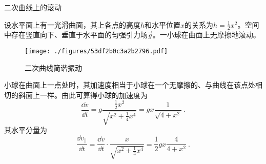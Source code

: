 \begin{example}{二次曲线上的滚动}

设水平面上有一光滑曲面，其上各点的高度$h$和水平位置$x$的关系为$h=\frac{1}{2}x^2$。空间中存在竖直向下、垂直于水平面的匀强引力场$\vec{g}$。一小球在曲面上无摩擦地滚动。

\begin{figure}[ht]
\centering
\texttt{[image: ./figures/53df2b0c3a2b2796.pdf]}
\caption{二次曲线简谐振动} \label{fig_SHOhs_2}
\end{figure}

小球在曲面上一点处时，其加速度相当于小球在一个无摩擦的、与曲线在该点处相切的斜面上一样。由此可算得小球的加速度为
\begin{equation}
\frac{\dd v}{\dd t} = g\frac{\frac{1}{2}x^2}{\sqrt{x^2+\frac{1}{4}x^4}} = gx\frac{1}{\sqrt{4+x^2}}~. 
\end{equation}
其水平分量为
\begin{equation}
\frac{\dd v_\parallel}{\dd t} = \frac{\dd v}{\dd t}\cdot\frac{x}{\sqrt{x^2+\frac{1}{4}x^4}} = \frac{1}{2}gx\frac{4}{4+x^2}~. 
\end{equation}

\end{example}


































